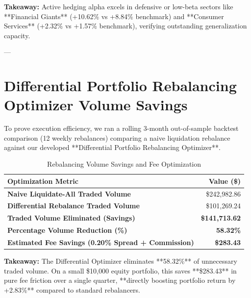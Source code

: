 \documentclass[11pt,article]{article}
\begin{document}
\textbf{Takeaway:} Active hedging alpha excels in defensive or low-beta sectors like **Financial Giants** (+10.62\% vs +8.84\% benchmark) and **Consumer Services** (+2.32\% vs +1.57\% benchmark), verifying outstanding generalization capacity.

---

\section{Differential Portfolio Rebalancing Optimizer Volume Savings}
To prove execution efficiency, we ran a rolling 3-month out-of-sample backtest comparison (12 weekly rebalances) comparing a naive liquidation rebalance against our developed **Differential Portfolio Rebalancing Optimizer**.

\begin{table}[h!]
\centering
\caption{Rebalancing Volume Savings and Fee Optimization}
\begin{tabular}{lr}
\toprule
\textbf{Optimization Metric} & \textbf{Value (\$)} \\
\midrule
\textbf{Naive Liquidate-All Traded Volume} & \$242,982.86 \\
\textbf{Differential Rebalance Traded Volume} & \$101,269.24 \\
\midrule
\textbf{Traded Volume Eliminated (Savings)} & \textbf{\$141,713.62} \\
\textbf{Percentage Volume Reduction (\%)} & \textbf{58.32\%} \\
\textbf{Estimated Fee Savings (0.20\% Spread + Commission)} & \textbf{\$283.43} \\
\bottomrule
\end{tabular}
\end{table}

\textbf{Takeaway:} The Differential Optimizer eliminates **58.32\%** of unnecessary traded volume. On a small \$10,000 equity portfolio, this saves **\$283.43** in pure fee friction over a single quarter, **directly boosting portfolio return by +2.83\%** compared to standard rebalancers.
\end{document}
